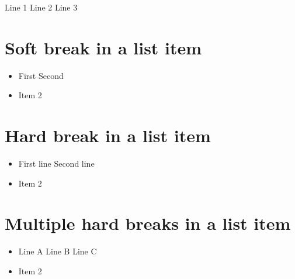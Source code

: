 \documentclass[11pt,a4paper]{article}
\begin{document}
Line 1
Line 2 Line 3

\section{Soft break in a list item}

\begin{itemize}
\item First Second
\item Item 2
\end{itemize}

\section{Hard break in a list item}

\begin{itemize}
\item First line
Second line
\item Item 2
\end{itemize}

\section{Multiple hard breaks in a list item}

\begin{itemize}
\item Line A
Line B
Line C
\item Item 2
\end{itemize}
\end{document}

